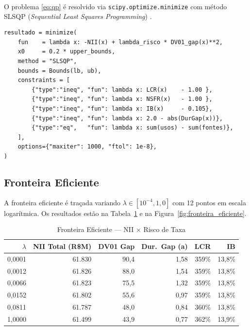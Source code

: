 \documentclass[12pt, a4paper, oneside]{article}
\newcommand{\fonte}[1]{%
  \par\smallskip
  \noindent{\footnotesize\textbf{Fonte:} #1}%
}
\begin{document}
O problema \eqref{eq:qp} é resolvido via \texttt{scipy.optimize.minimize}
com método SLSQP (\textit{Sequential Least Squares Programming})
\citep{Kraft1988}.

\begin{lstlisting}[caption={Estrutura central do otimizador
                   (\texttt{ALMOptimizer.otimizar})},
                   label={lst:optimizer}]
resultado = minimize(
    fun    = lambda x: -NII(x) + lambda_risco * DV01_gap(x)**2,
    x0     = 0.2 * upper_bounds,
    method = "SLSQP",
    bounds = Bounds(lb, ub),
    constraints = [
        {"type":"ineq", "fun": lambda x: LCR(x)    - 1.00 },
        {"type":"ineq", "fun": lambda x: NSFR(x)   - 1.00 },
        {"type":"ineq", "fun": lambda x: IB(x)     - 0.105},
        {"type":"ineq", "fun": lambda x: 2.0 - abs(DurGap(x))},
        {"type":"eq",   "fun": lambda x: sum(usos) - sum(fontes)},
    ],
    options={"maxiter": 1000, "ftol": 1e-8},
)
\end{lstlisting}

\subsection{Fronteira Eficiente}

A fronteira eficiente é traçada variando $\lambda \in [10^{-4}, 1{,}0]$
com 12 pontos em escala logarítmica. Os resultados estão na
Tabela~\ref{tab:fronteira_eficiente} e na Figura~\ref{fig:fronteira_eficiente}.

\begin{table}[H]
\centering
\caption{Fronteira Eficiente --- NII $\times$ Risco de Taxa}
\label{tab:fronteira_eficiente}
\begin{tabular}{rrrrrr}
\toprule
$\lambda$ & \textbf{NII Total (R\$M)} & \textbf{DV01 Gap} &
  \textbf{Dur.\ Gap (a)} & \textbf{LCR} & \textbf{IB} \\
\midrule
0,0001 & 61.830 & 90,4 & 1,58 & 359\% & 13,8\% \\
0,0012 & 61.826 & 88,0 & 1,54 & 359\% & 13,8\% \\
0,0066 & 61.823 & 75,5 & 1,32 & 359\% & 13,8\% \\
0,0152 & 61.802 & 55,6 & 0,97 & 359\% & 13,8\% \\
0,0811 & 61.787 & 48,0 & 0,84 & 360\% & 13,8\% \\
1,0000 & 61.499 & 43,9 & 0,77 & 362\% & 13,9\% \\
\bottomrule
\end{tabular}
\fonte{Elaborado pelo autor.}
\end{table}
\end{document}
